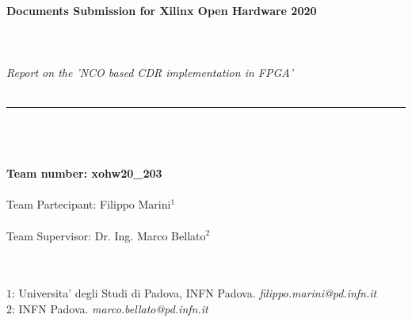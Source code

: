 \documentclass[11pt]{article}
\renewcommand{\>}{\rangle} \renewcommand{\emptyset}{\varnothing}
\begin{document}
\begin{center}
  \textit{ }\\
  \textit{ }\\
  \textit{ }\\
  \textbf{\large{Documents Submission for Xilinx Open Hardware 2020}}\\
  \textit{ }\\
  \textit{ }\\
  \textit{ }\\
  \textit{\Large{Report on the 'NCO based CDR implementation in FPGA'}} \\
  \textit{ }\\
  \noindent\rule{16cm}{0.4pt}
  \textit{ }\\
  \textit{ }\\
  \textit{ }\\
  \textbf{Team number: xohw20\_203}\\
  \textit{ }\\
  Team Partecipant: Filippo Marini$^1$\\
  \textit{ }\\
  Team Supervisor: Dr. Ing. Marco Bellato$^2$\\
  \textit{ }\\
\end{center}

\textit{ }\\
$1$: Universita' degli Studi di Padova, INFN Padova. \textit{filippo.marini@pd.infn.it}\\
$2$: INFN Padova. \textit{marco.bellato@pd.infn.it}\\
\newpage

\tableofcontents

\newpage
\end{document}
